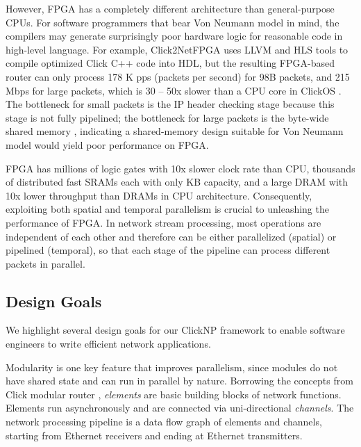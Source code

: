 {However, FPGA has a completely different architecture than general-purpose CPUs. For software programmers that bear Von Neumann model in mind, the compilers may generate surprisingly poor hardware logic for reasonable code in high-level language. For example, Click2NetFPGA \cite{Click2NetFPGA} uses LLVM and HLS tools to compile optimized Click C++ code into HDL, but the resulting FPGA-based router can only process 178 K pps (packets per second) for 98B packets, and 215 Mbps for large packets, which is 30 -- 50x slower than a CPU core in ClickOS \cite{martins2014clickos}. The bottleneck for small packets is the IP header checking stage \cite{Click2NetFPGA} because this stage is not fully pipelined; the bottleneck for large packets is the byte-wide shared memory \cite{Click2NetFPGA}, indicating a shared-memory design suitable for Von Neumann model would yield poor performance on FPGA.

FPGA has millions of logic gates with 10x slower clock rate than CPU, thousands of distributed fast SRAMs each with only KB capacity, and a large DRAM with 10x lower throughput than DRAMs in CPU architecture. Consequently, exploiting both spatial and temporal parallelism is crucial to unleashing the performance of FPGA. In network stream processing, most operations are independent of each other and therefore can be either parallelized (spatial) or pipelined (temporal), so that each stage of the pipeline can process different packets in parallel.

\subsection{Design Goals}
\label{clicknp:subsec:designgoals}

We highlight several design goals for our ClickNP framework to enable software engineers to write efficient network applications.

 Modularity is one key feature that improves parallelism, since modules do not have shared state and can run in parallel by nature. Borrowing the concepts from Click modular router \cite{kohler2000click}, \textit{elements} are basic building blocks of network functions. Elements run asynchronously and are connected via uni-directional \textit{channels}. The network processing pipeline is a data flow graph of elements and channels, starting from Ethernet receivers and ending at Ethernet transmitters.

}
